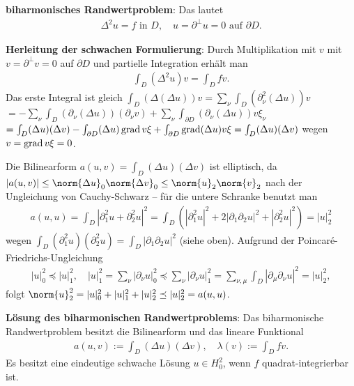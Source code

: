\textbf{biharmonisches Randwertproblem}:
Das  lautet
\begin{align*}
    \Delta^2 u = f \text{ in } D,\quad
    u = \partial^\perp u = 0 \text{ auf } \partial D.
\end{align*}

\linie

\textbf{Herleitung der schwachen Formulierung}:
Durch Multiplikation mit $v$ mit $v = \partial^\perp v = 0$ auf $\partial D$ und
partielle Integration erhält man
\begin{align*}
    \int_D (\Delta^2 u) v = \int_D fv.
\end{align*}
Das erste Integral ist gleich $\int_D (\Delta (\Delta u)) v =
\sum_\nu \int_D (\partial_\nu^2 (\Delta u)) v$\\
$= -\sum_\nu \int_D (\partial_\nu (\Delta u)) (\partial_\nu v) +
\sum_\nu \int_{\partial D} (\partial_\nu (\Delta u)) v \xi_\nu$\\
$= \int_D (\Delta u) (\Delta v) -
\int_{\partial D} (\Delta u) \operatorname{grad} v \xi +
\int_{\partial D} \operatorname{grad}(\Delta u) v \xi = \int_D (\Delta u) (\Delta v)$
wegen $v = \operatorname{grad} v \xi = 0$.

Die Bilinearform $a(u, v) = \int_D (\Delta u) (\Delta v)$ ist elliptisch, da
$|a(u, v)| \le \norm{\Delta u}_0 \norm{\Delta v}_0 \le \norm{u}_2 \norm{v}_2$
nach der Ungleichung von Cauchy-Schwarz --
für die untere Schranke benutzt man
\begin{align*}
    a(u, u) = \int_D |\partial_1^2 u + \partial_2^2 u|^2
    = \int_D \left(|\partial_1^2 u|^2 + 2|\partial_1 \partial_2 u|^2 + |\partial_2^2 u|^2\right)
    = |u|_2^2
\end{align*}
wegen $\int_D (\partial_1^2 u)(\partial_2^2 u) = \int_D |\partial_1 \partial_2 u|^2$ (siehe oben).
Aufgrund der Poincaré-Friedrichs-Ungleichung
\begin{align*}
    |u|_0^2 \preceq |u|_1^2,\quad
    |u|_1^2 = \sum_\nu |\partial_\nu u|_0^2 \preceq \sum_\nu |\partial_\nu u|_1^2
    = \sum_{\nu,\mu} \int_D |\partial_\mu \partial_\nu u|^2 = |u|_2^2,
\end{align*}
folgt $\norm{u}_2^2 = |u|_0^2 + |u|_1^2 + |u|_2^2 \preceq |u|_2^2 = a(u, u)$.

\linie

\textbf{Lösung des biharmonischen Randwertproblems}:
Das biharmonische Randwertproblem besitzt die Bilinearform und das lineare Funktional
\begin{align*}
    a(u, v) := \int_D (\Delta u) (\Delta v),\quad
    \lambda(v) := \int_D fv.
\end{align*}
Es besitzt eine eindeutige schwache Lösung $u \in H_0^2$, wenn $f$ quadrat-integrierbar ist.

